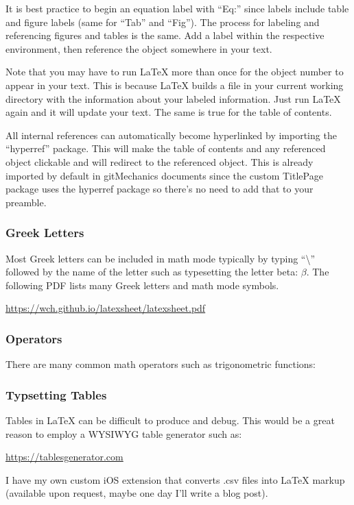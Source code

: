 It is best practice to begin an equation label with ``Eq:'' since labels include table and figure labels (same for ``Tab'' and ``Fig''). The process for labeling and referencing figures and tables is the same. Add a label within the respective environment, then reference the object somewhere in your text.

Note that you may have to run \LaTeX{} more than once for the object number to appear in your text. This is because \LaTeX{} builds a file in your current working directory with the information about your labeled information. Just run \LaTeX{} again and it will update your text. The same is true for the table of contents.

All internal references can automatically become hyperlinked by importing the ``hyperref'' package. This will make the table of contents and any referenced object clickable and will redirect to the referenced object. This is already imported by default in gitMechanics documents since the custom TitlePage package uses the hyperref package so there's no need to add that to your preamble.

\subsubsection{Greek Letters}
Most Greek letters can be included in math mode typically by typing ``\textbackslash'' followed by the name of the letter such as typesetting the letter beta: $\beta$. The following PDF lists many Greek letters and math mode symbols.

\begin{center}
	\url{https://wch.github.io/latexsheet/latexsheet.pdf}
\end{center}

\subsubsection{Operators}
There are many common math operators such as trigonometric functions: 

\begin{center}
\begin{latexcode}
\sin \csc
\cos \sec
\tan \cot
\end{latexcode}
\end{center}

\subsubsection{Typsetting Tables}
Tables in \LaTeX{} can be difficult to produce and debug. This would be a great reason to employ a WYSIWYG table generator such as:
\begin{center}
	\url{https://tablesgenerator.com}
\end{center}

I have my own custom iOS extension that converts .csv files into \LaTeX{} markup (available upon request, maybe one day I'll write a blog post). 








